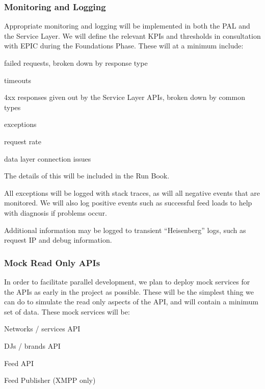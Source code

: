 \documentclass[a4paper, 11pt]{scrreprt}
\begin{document}
\subsubsection{Monitoring and Logging}
\label{h.d6ie97pxf3df}
Appropriate monitoring and logging will be implemented in both the PAL and the Service Layer. We will define the relevant KPIs and thresholds in consultation with EPIC during the Foundations Phase. These will at a minimum include:



\begin{tystrul}


\item failed requests, broken down by response type

\item timeouts

\item 4xx responses given out by the Service Layer APIs, broken down by common types

\item exceptions

\item request rate

\item data layer connection issues

\end{tystrul}

The details of this will be included in the Run Book.

All exceptions will be logged with stack traces, as will all negative events that are monitored. We will also log positive events such as successful feed loads to help with diagnosis if problems occur.

Additional information may be logged to transient “Heisenberg” logs, such as request IP and debug information.


\subsubsection{Mock Read Only APIs}
\label{h.olg6wym6a7ao}
In order to facilitate parallel development, we plan to deploy mock services for the APIs as early in the project as possible. These will be the simplest thing we can do to simulate the read only aspects of the API, and will contain a minimum set of data. These mock services will be:



\begin{tystrul}


\item Networks / services API

\item DJs / brands API

\item Feed API

\item Feed Publisher (XMPP only)

\end{tystrul}
\end{document}
